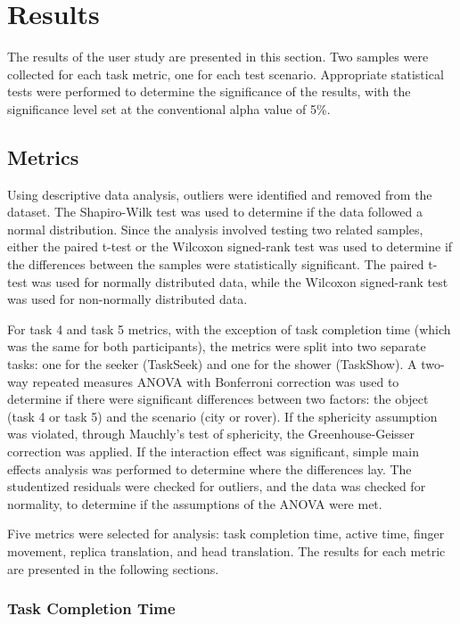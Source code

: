 \section{Results}

    The results of the user study are presented in this section. Two samples were collected for each task metric, one for each test scenario. Appropriate statistical tests were performed to determine the significance of the results, with the significance level set at the conventional alpha value of 5\%.

    \subsection{Metrics}

        Using descriptive data analysis, outliers were identified and removed from the dataset. The Shapiro-Wilk test \cite{shapiroAnalysisVarianceTest1965} was used to determine if the data followed a normal distribution. Since the analysis involved testing two related samples, either the paired t-test or the Wilcoxon signed-rank test \cite{wilcoxonIndividualComparisonsRanking1945}was used to determine if the differences between the samples were statistically significant. The paired t-test was used for normally distributed data, while the Wilcoxon signed-rank test was used for non-normally distributed data.

        For task 4 and task 5 metrics, with the exception of task completion time (which was the same for both participants), the metrics were split into two separate tasks: one for the seeker (TaskSeek) and one for the shower (TaskShow). A two-way repeated measures ANOVA with Bonferroni correction was used to determine if there were significant differences between two factors: the object (task 4 or task 5) and the scenario (city or rover). If the sphericity assumption was violated, through Mauchly's test of sphericity, the Greenhouse-Geisser correction was applied. If the interaction effect was significant, simple main effects analysis was performed to determine where the differences lay. The studentized residuals were checked for outliers, and the data was checked for normality, to determine if the assumptions of the ANOVA were met.

        Five metrics were selected for analysis: task completion time, active time, finger movement, replica translation, and head translation. The results for each metric are presented in the following sections.

        \subsubsection{Task Completion Time}

